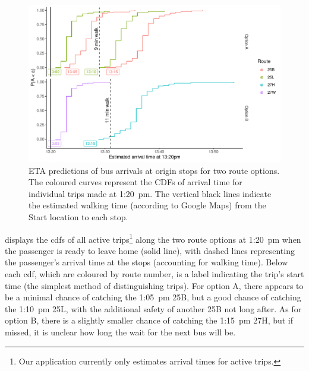 \begin{knitrout}\small
{}\color{fgcolor}\begin{figure}

{\centering \includegraphics[width=\textwidth]{figure/eta_journey_arrival-1} 

}

\caption[ETA predictions of bus arrivals at origin stops for two route options]{ETA predictions of bus arrivals at origin stops for two route options. The coloured curves represent the CDFs of arrival time for individual trips made at 1:20~pm. The vertical black lines indicate the estimated walking time (according to Google Maps) from the Start location to each stop.}\label{fig:eta_journey_arrival}
\end{figure}


\end{knitrout}



 displays the \glspl{cdf} of all active trips\footnote{Our application currently only estimates arrival times for active trips.} along the two route options at  1:20~pm when the passenger is ready to leave home (solid line), with dashed lines representing the passenger's arrival time at the stops (accounting for walking time). Below each \gls{cdf}, which are coloured by route number, is a label indicating the trip's start time (the simplest method of distinguishing trips). For option A, there appears to be a minimal chance of catching the 1:05~pm 25B, but a good chance of catching the 1:10~pm 25L, with the additional safety of another 25B not long after. As for option B, there is a slightly smaller chance of catching the 1:15~pm 27H, but if missed, it is unclear how long the wait for the next bus will be.


